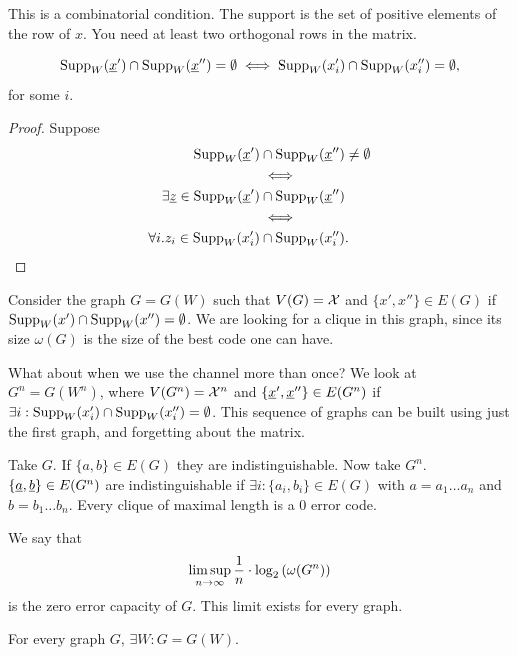 This is a combinatorial condition.
The support is the set of positive elements of the row of $x$.
You need at least two orthogonal rows in the matrix.

\begin{obs}
	\begin{equation*}
		\mathrm{Supp}_W(\underline{x}') \cap \mathrm{Supp}_W(\underline{x}'') = \emptyset
		\iff
		\mathrm{Supp}_W(x_i') \cap \mathrm{Supp}_W(x_i'') = \emptyset,
	\end{equation*}
	for some $i$. 
\end{obs}

\begin{proof}
	Suppose 
	\begin{align*}
		\mathrm{Supp}_W(\underline{x}') & \cap \mathrm{Supp}_W(\underline{x}'') \neq \emptyset
		\\
		& \iff
		\\
		\exists \underline{z} \in \mathrm{Supp}_W(\underline{x}') & \cap \mathrm{Supp}_W(\underline{x}'')
		\\
		& \iff
		\\
		\forall i . 
		z_i \in \mathrm{Supp}_W(x_i') & \cap \mathrm{Supp}_W(x_i''). \qedhere
	\end{align*}
\end{proof}

Consider the graph $G = G(W)$ such that $V(G) = \mathcal{X}$ and $\{x', x''\} \in E(G)$ if $\mathrm{Supp}_W(x') \cap \mathrm{Supp}_W(x'') = \emptyset$.
We are looking for a clique in this graph, since its size $\omega(G)$ is the size of the best code one can have.

What about when we use the channel more than once?
We look at $G^n = G(W^n)$, where $V(G^n) = \mathcal{X}^n$ and $\{\underline{x}', \underline{x}''\} \in E(G^n)$ if $\exists i : \mathrm{Supp}_W(x_i') \cap \mathrm{Supp}_W(x_i'') = \emptyset$.
This sequence of graphs can be built using just the first graph, and forgetting about the matrix.

Take $G$.
If $\{a, b\} \in E(G)$ they are indistinguishable.
Now take $G^n$.
$\{\underline{a}, \underline{b}\} \in E(G^n)$ are indistinguishable if $\exists i : \{a_i, b_i\} \in E(G)$ with $a = a_1 \dots a_n$ and $b = b_1 \dots b_n$.
Every clique of maximal length is a 0 error code.

We say that 
\begin{equation*}
	\limsup_{n \to \infty} \frac{1}{n} \cdot \log_2 \left( {\omega(G^n)} \right)
\end{equation*}
is the zero error capacity of $G$.
This limit exists for every graph.

\begin{prop}
	For every graph $G$, $\exists W : G = G(W)$.
\end{prop}

